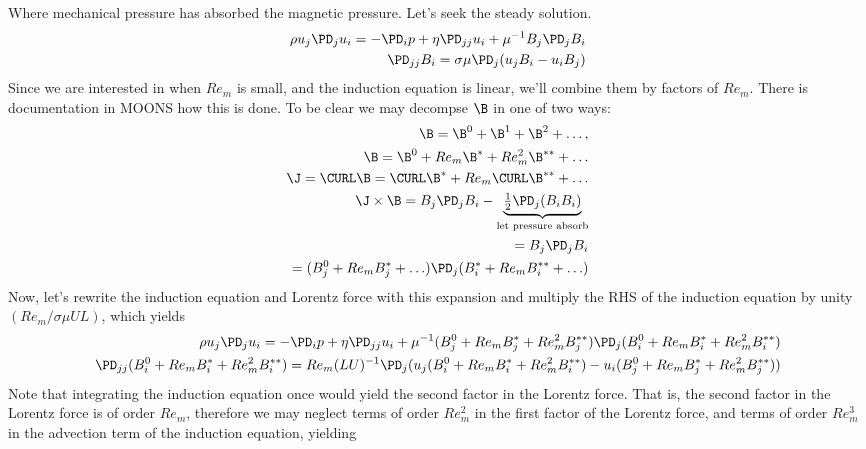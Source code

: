 \documentclass[11pt]{article}
\begin{document}
Where mechanical pressure has absorbed the magnetic pressure. Let's seek the steady solution.
\begin{equation}\begin{aligned}
\rho u_j \PD_j u_i = - \PD_i p + \eta \PD_{jj} u_i + \mu^{-1} B_j \PD_j B_i \\
\PD_{jj} B_i = \sigma \mu \PD_j (u_j B_i - u_i B_j)
\end{aligned} \end{equation}
Since we are interested in when $Re_m$ is small, and the induction equation is linear, we'll combine them by factors of $Re_m$. There is documentation in MOONS how this is done. To be clear we may decompse $\B$ in one of two ways:
\begin{equation}\begin{aligned}
	\B = \B^0 + \B^1 + \B^2 + \hdots , \\
	\B = \B^0 + Re_m \B^* + Re_m^2 \B^{**} + \hdots \\
	\J = \CURL \B = \CURL \B^* + Re_m \CURL \B^{**} + \hdots \\
	\J \times \B = B_j \PD_j B_i - \underbrace{\tfrac{1}{2} \PD_j (B_i B_i)}_{\text{let pressure absorb}} \\
	= B_j \PD_j B_i \\
	= (B_j^0+Re_m B_j^* + \hdots) \PD_j (B_i^*+Re_m B_i^{**} + \hdots) \\
\end{aligned} \end{equation}
Now, let's rewrite the induction equation and Lorentz force with this expansion
and multiply the RHS of the induction equation by unity $(Re_m/\sigma \mu U L)$, which yields
\begin{equation}\begin{aligned}
\rho u_j \PD_j u_i = - \PD_i p + \eta \PD_{jj} u_i + \mu^{-1} (B_j^0 + Re_m B_j^* + Re_m^2 B_j^{**}) \PD_j (B_i^0 + Re_m B_i^* + Re_m^2 B_i^{**}) \\
\PD_{jj} (B_i^0 + Re_m B_i^* + Re_m^2 B_i^{**}) = Re_m (LU)^{-1} \PD_j (u_j (B_i^0 + Re_m B_i^* + Re_m^2 B_i^{**}) - u_i (B_j^0 + Re_m B_j^* + Re_m^2 B_j^{**}))
\end{aligned} \end{equation}
Note that integrating the induction equation once would yield the second factor in the 
Lorentz force. That is, the second factor in the Lorentz force is of order $Re_m$, therefore
we may neglect terms of order $Re_m^2$ in the first factor of the Lorentz force, and terms of 
order $Re_m^3$ in the advection term of the induction equation, yielding
\end{document}
